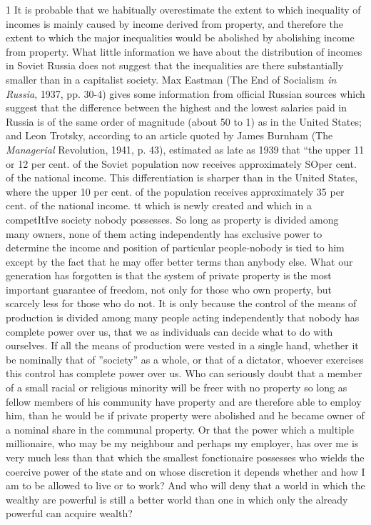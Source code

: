 \documentclass[11pt,openany]{book}
\begin{document}
1 It is probable that we habitually overestimate the extent to which inequality of incomes is mainly caused by income derived from property, and therefore the extent to which the major inequalities would be abolished by abolishing income from property. What little information we have about the distribution of incomes in Soviet Russia does not suggest that the inequalities are there substantially smaller than in a capitalist society. Max Eastman (The End of Socialism \emph{in Russia}, 1937, pp. 30-4) gives some information from official Russian sources which suggest that the difference between the highest and the lowest salaries paid in Russia is of the same order of magnitude (about 50 to 1) as in the United States; and Leon Trotsky, according to an article quoted by James Burnham (The \emph{Managerial} Revolution, 1941, p. 43), estimated as late as 1939 that ``the upper 11 or 12 per cent. of the Soviet population now receives approximately SOper cent. of the national income. This differentiation is sharper than in the United States, where the upper 10 per cent. of the population receives approximately 35 per cent. of the national income. tt which is newly created and which in a competItIve society nobody possesses. So long as property is divided among many owners, none of them acting independently has exclusive power to determine the income and position of particular people-nobody is tied to him except by the fact that he may offer better terms than anybody else. What our generation has forgotten is that the system of private property is the most important guarantee of freedom, not only for those who own property, but scarcely less for those who do not. It is only because the control of the means of production is divided among many people acting independently that nobody has complete power over us, that we as individuals can decide what to do with ourselves. If all the means of production were vested in a single hand, whether it be nominally that of ''society'' as a whole, or that of a dictator, whoever exercises this control has complete power over us. Who can seriously doubt that a member of a small racial or religious minority will be freer with no property so long as fellow members of his community have property and are therefore able to employ him, than he would be if private property were abolished and he became owner of a nominal share in the communal property. Or that the power which a multiple millionaire, who may be my neighbour and perhaps my employer, has over me is very much less than that which the smallest fonctionaire possesses who wields the coercive power of the state and on whose discretion it depends whether and how I am to be allowed to live or to work? And who will deny that a world in which the wealthy are powerful is still a better world than one in which only the already powerful can acquire wealth?
\end{document}
